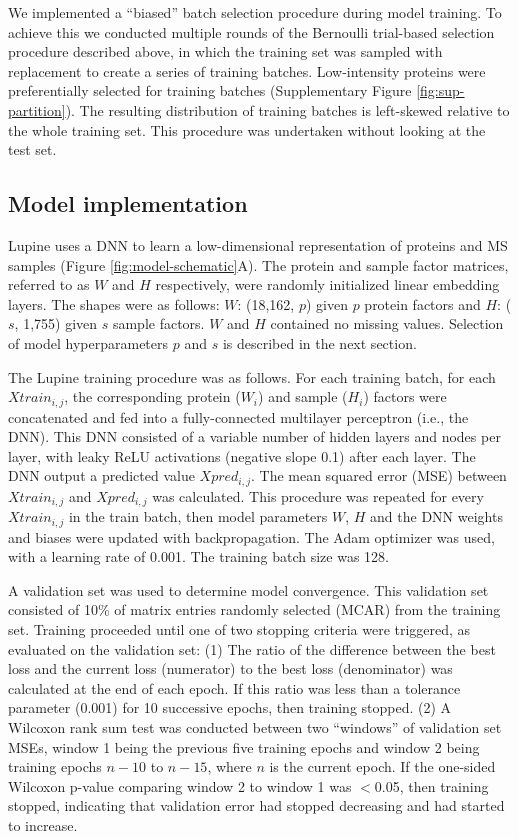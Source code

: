 \documentclass{article}
\begin{document}
We implemented a ``biased'' batch selection procedure during model training. To achieve this we conducted multiple rounds of the Bernoulli trial-based selection procedure described above, in which the training set was sampled with replacement to create a series of training batches. Low-intensity proteins were preferentially selected for training batches (Supplementary Figure \ref{fig:sup-partition}). The resulting distribution of training batches is left-skewed relative to the whole training set. This procedure was undertaken without looking at the test set. 

\subsection{Model implementation}
\label{sec:model}

Lupine uses a DNN to learn a low-dimensional representation of proteins and MS samples (Figure \ref{fig:model-schematic}A). The protein and sample factor matrices, referred to as $W$ and $H$ respectively, were randomly initialized linear embedding layers. The shapes were as follows: $W$: (18,162, $p$) given $p$ protein factors and $H$: ($s$, 1,755) given $s$ sample factors. $W$ and $H$ contained no missing values. Selection of model hyperparameters $p$ and $s$ is described in the next section. 

The Lupine training procedure was as follows. For each training batch, for each $Xtrain_{i,j}$, the corresponding protein ($W_{i}$) and sample ($H_{i}$) factors were concatenated and fed into a fully-connected multilayer perceptron (i.e., the DNN). This DNN consisted of a variable number of hidden layers and nodes per layer, with leaky ReLU activations (negative slope 0.1) after each layer. The DNN output a predicted value $Xpred_{i,j}$. The mean squared error (MSE) between $Xtrain_{i,j}$ and $Xpred_{i,j}$ was calculated. This procedure was repeated for every $Xtrain_{i,j}$ in the train batch, then model parameters $W$, $H$ and the DNN weights and biases were updated with backpropagation. The Adam optimizer was used, with a learning rate of 0.001. The training batch size was 128. 

A validation set was used to determine model convergence. This validation set consisted of 10\% of matrix entries randomly selected (MCAR) from the training set. Training proceeded until one of two stopping criteria were triggered, as evaluated on the validation set: (1) The ratio of the difference between the best loss and the current loss (numerator) to the best loss (denominator) was calculated at the end of each epoch. If this ratio was less than a tolerance parameter (0.001) for 10 successive epochs, then training stopped. (2) A Wilcoxon rank sum test was conducted between two ``windows'' of validation set MSEs, window 1 being the previous five training epochs and window 2 being training epochs $n-10$ to $n-15$, where $n$ is the current epoch. If the one-sided Wilcoxon p-value comparing window 2 to window 1 was $<$0.05, then training stopped, indicating that validation error had stopped decreasing and had started to increase.
\end{document}
